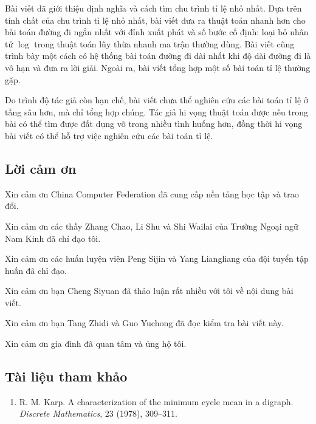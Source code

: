 \documentclass[11pt]{article}
\begin{document}
Bài viết đã giới thiệu định nghĩa và cách tìm chu trình tỉ lệ nhỏ nhất. Dựa
trên tính chất của chu trình tỉ lệ nhỏ nhất, bài viết đưa ra thuật toán nhanh
hơn cho bài toán đường đi ngắn nhất với đỉnh xuất phát và số bước cố định: loại
bỏ nhân tử \(\log\) trong thuật toán lũy thừa nhanh ma trận thường dùng. Bài
viết cũng trình bày một cách có hệ thống bài toán đường đi dài nhất khi độ dài
đường đi là vô hạn và đưa ra lời giải. Ngoài ra, bài viết tổng hợp một số bài
toán tỉ lệ thường gặp.

Do trình độ tác giả còn hạn chế, bài viết chưa thể nghiên cứu các bài toán tỉ
lệ ở tầng sâu hơn, mà chỉ tổng hợp chúng. Tác giả hi vọng thuật toán được nêu
trong bài có thể tìm được đất dụng võ trong nhiều tình huống hơn, đồng thời hi
vọng bài viết có thể hỗ trợ việc nghiên cứu các bài toán tỉ lệ.

\subsection*{Lời cảm ơn}

Xin cảm ơn China Computer Federation đã cung cấp nền tảng học tập và trao đổi.

Xin cảm ơn các thầy Zhang Chao, Li Shu và Shi Wailai của Trường Ngoại ngữ Nam
Kinh đã chỉ đạo tôi.

Xin cảm ơn các huấn luyện viên Peng Sijin và Yang Liangliang của đội tuyển tập
huấn đã chỉ đạo.

Xin cảm ơn bạn Cheng Siyuan đã thảo luận rất nhiều với tôi về nội dung bài
viết.

Xin cảm ơn bạn Tang Zhidi và Guo Yuchong đã đọc kiểm tra bài viết này.

Xin cảm ơn gia đình đã quan tâm và ủng hộ tôi.

\subsection*{Tài liệu tham khảo}

\begin{enumerate}
\item R. M. Karp. A characterization of the minimum cycle mean in a digraph.
\emph{Discrete Mathematics}, 23 (1978), 309--311.
\end{enumerate}
\end{document}
